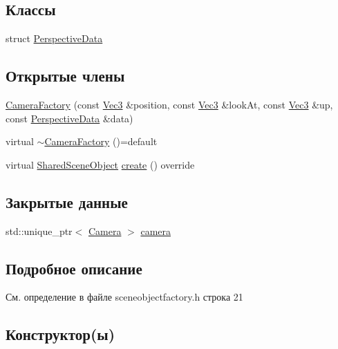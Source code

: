 \subsection*{Классы}
\begin{DoxyCompactItemize}
\item 
struct \hyperlink{struct_camera_factory_1_1_perspective_data}{Perspective\+Data}
\end{DoxyCompactItemize}
\subsection*{Открытые члены}
\begin{DoxyCompactItemize}
\item 
\hyperlink{class_camera_factory_a73bf5c839340ca2a94ce52a1c400d231}{Camera\+Factory} (const \hyperlink{vec3_8h_a221ad8ea4d9be4111628ee1ca22ee3ba}{Vec3} \&position, const \hyperlink{vec3_8h_a221ad8ea4d9be4111628ee1ca22ee3ba}{Vec3} \&look\+At, const \hyperlink{vec3_8h_a221ad8ea4d9be4111628ee1ca22ee3ba}{Vec3} \&up, const \hyperlink{struct_camera_factory_1_1_perspective_data}{Perspective\+Data} \&data)
\item 
virtual \hyperlink{class_camera_factory_ab63fa4fcfc787465aa1b2d5bf03e9a4d}{$\sim$\+Camera\+Factory} ()=default
\item 
virtual \hyperlink{sceneobject_8h_af9afe0f4fe2038e305b8b22ff495305f}{Shared\+Scene\+Object} \hyperlink{class_camera_factory_a7a105ab24599d2d48fc03f40a28a1492}{create} () override
\end{DoxyCompactItemize}
\subsection*{Закрытые данные}
\begin{DoxyCompactItemize}
\item 
std\+::unique\+\_\+ptr$<$ \hyperlink{class_camera}{Camera} $>$ \hyperlink{class_camera_factory_ad1e2114f133f8489e790a4f42b377de3}{camera}
\end{DoxyCompactItemize}


\subsection{Подробное описание}


См. определение в файле sceneobjectfactory.\+h строка 21



\subsection{Конструктор(ы)}
